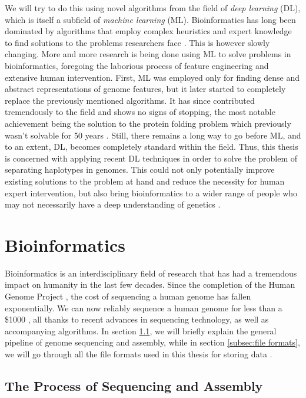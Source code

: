 \documentclass[times, utf8, diplomski, english]{fer_eng}
\begin{document}
We will try to do this using novel algorithms from the field of \textit{deep learning} (DL), which is itself a subfield of \textit{machine learning} (ML). Bioinformatics has long been dominated by algorithms that employ complex heuristics and expert knowledge to find solutions to the problems researchers face \cite{compeau_pevzner_2015}. This is however slowly changing. More and more research is being done using ML to solve problems in bioinformatics, foregoing the laborious process of feature engineering and extensive human intervention. First, ML was employed only for finding dense and abstract representations of genome features, but it later started to completely replace the previously mentioned algorithms. It has since contributed tremendously to the field and shows no signs of stopping, the most notable achievement being the solution to the protein folding problem which previously wasn't solvable for 50 years \cite{alphafold}. Still, there remains a long way to go before ML, and to an extent, DL, becomes completely standard within the field. Thus, this thesis is concerned with applying recent DL techniques in order to solve the problem of separating haplotypes in genomes. This could not only potentially improve existing solutions to the problem at hand and reduce the necessity for human expert intervention, but also bring bioinformatics to a wider range of people who may not necessarily have a deep understanding of genetics \cite{dl_bioinformatics}.

\section{Bioinformatics}

Bioinformatics is an interdisciplinary field of research that has had a tremendous impact on humanity in the last few decades. Since the completion of the Human Genome Project \cite{HGP1} \cite{HGP2}, the cost of sequencing a human genome has fallen exponentially. We can now reliably sequence a human genome for less than a \$1000 \cite{genome_cost}, all thanks to recent advances in sequencing technology, as well as accompanying algorithms. In section \ref{subsec:the process of sequencing and assembly}, we will briefly explain the general pipeline of genome sequencing and assembly, while in section \ref{subsec:file formats}, we will go through all the file formats used in this thesis for storing data	.

\subsection{The Process of Sequencing and Assembly}
\label{subsec:the process of sequencing and assembly}
\end{document}
